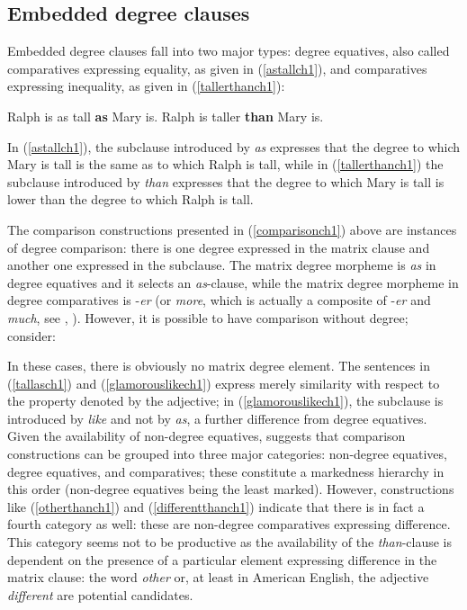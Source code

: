 \subsection{Embedded degree clauses} \label{sec:1degree}
Embedded degree clauses fall into two major types: degree equatives, also called comparatives expressing equality, as given in (\ref{astallch1}), and comparatives expressing inequality, as given in (\ref{tallerthanch1}):

\ea \label{comparisonch1}
\ea Ralph is as tall \textbf{as} Mary is.\label{astallch1}
\ex Ralph is taller \textbf{than} Mary is.\label{tallerthanch1}
\z
\z

In (\ref{astallch1}), the subclause introduced by \textit{as} expresses that the degree to which Mary is tall is the same as to which Ralph is tall, while in (\ref{tallerthanch1}) the subclause introduced by \textit{than} expresses that the degree to which Mary is tall is lower than the degree to which Ralph is tall.

The comparison constructions presented in (\ref{comparisonch1}) above are instances of degree comparison: there is one degree expressed in the matrix clause and another one expressed in the subclause. The matrix degree morpheme is \textit{as} in degree equatives and it selects an \textit{as}-clause, while the matrix degree morpheme in degree comparatives is -\textit{er} (or \textit{more}, which is actually a composite of -\textit{er} and \textit{much}, see \citealt{bresnan1973}, \citealt{bacskaiatkari2014diss, bacskaiatkari2018langsci}). However, it is possible to have comparison without degree; consider:

\ea \label{nondegreecomparisonch1}
\z
\z

In these cases, there is obviously no matrix degree element. The sentences in (\ref{tallasch1}) and (\ref{glamorouslikech1}) express merely similarity with respect to the property denoted by the adjective; in (\ref{glamorouslikech1}), the subclause is introduced by \textit{like} and not by \textit{as}, a further difference from degree equatives. Given the availability of non-degree equatives, \citet[35]{jaeger2018} suggests that comparison constructions can be grouped into three major categories: non-degree equatives, degree equatives, and comparatives; these constitute a markedness hierarchy in this order (non-degree equatives being the least marked). However, constructions like (\ref{otherthanch1}) and (\ref{differentthanch1}) indicate that there is in fact a fourth category as well: these are non-degree comparatives expressing difference. This category seems not to be productive as the availability of the \textit{than}-clause is dependent on the presence of a particular element expressing difference in the matrix clause: the word \textit{other} or, at least in American English, the adjective \textit{different} are potential candidates.

